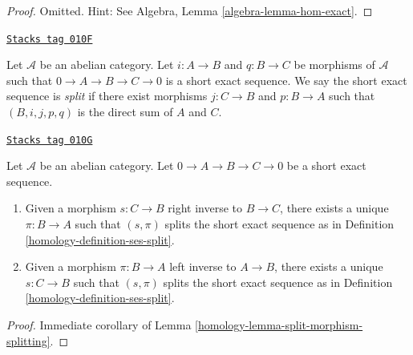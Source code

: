 \begin{proof}
Omitted. Hint: See
Algebra, Lemma \ref{algebra-lemma-hom-exact}.
\end{proof}

\begin{definition}
\label{homology-definition-ses-split}
\href{https://stacks.math.columbia.edu/tag/010F}{\texttt{Stacks tag 010F}}

Let $\mathcal{A}$ be an abelian category.
Let $i : A \to B$ and $q : B \to C$ be morphisms
of $\mathcal{A}$ such that
$0 \to A \to B \to C \to 0$ is a short
exact sequence. We say the short exact
sequence is {\it split} if there exist
morphisms $j : C \to B$ and $p : B \to A$ such
that $(B, i, j, p, q)$ is the direct sum of $A$ and $C$.
\end{definition}

\begin{lemma}
\label{homology-lemma-ses-split}
\href{https://stacks.math.columbia.edu/tag/010G}{\texttt{Stacks tag 010G}}

Let $\mathcal{A}$ be an abelian category.
Let $0 \to A \to B \to C \to 0$
be a short exact sequence.
\begin{enumerate}
\item Given a morphism $s : C \to B$ right inverse to
$B \to C$, there exists a unique $\pi : B \to A$
such that $(s, \pi)$ splits the short exact sequence
as in Definition \ref{homology-definition-ses-split}.
\item Given a morphism $\pi : B \to A$ left inverse to
$A \to B$, there exists a unique $s : C \to B$
such that $(s, \pi)$ splits the short exact sequence
as in Definition \ref{homology-definition-ses-split}.
\end{enumerate}
\end{lemma}

\begin{proof}

Immediate corollary of Lemma \ref{homology-lemma-split-morphism-splitting}.
\end{proof}

